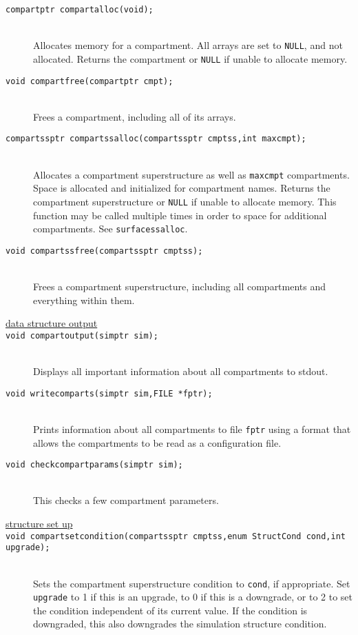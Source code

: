 \documentclass {book}
\begin{document}
\begin{description}
\item[\texttt{compartptr compartalloc(void);}]
\hfill \\
Allocates memory for a compartment.  All arrays are set to \texttt{NULL}, and not allocated.  Returns the compartment or \texttt{NULL} if unable to allocate memory.

\item[\texttt{void compartfree(compartptr cmpt);}]
\hfill \\
Frees a compartment, including all of its arrays.

\item[\texttt{compartssptr compartssalloc(compartssptr cmptss,int maxcmpt);}]
\hfill \\
Allocates a compartment superstructure as well as \texttt{maxcmpt} compartments.  Space is allocated and initialized for compartment names.  Returns the compartment superstructure or \texttt{NULL} if unable to allocate memory.  This function may be called multiple times in order to space for additional compartments.  See \texttt{surfacessalloc}.

\item[\texttt{void compartssfree(compartssptr cmptss);}]
\hfill \\
Frees a compartment superstructure, including all compartments and everything within them.

\item[\underline{data structure output}]

\item[\texttt{void compartoutput(simptr sim);}]
\hfill \\
Displays all important information about all compartments to stdout.

\item[\texttt{void writecomparts(simptr sim,FILE *fptr);}]
\hfill \\
Prints information about all compartments to file \texttt{fptr} using a format that allows the compartments to be read as a configuration file.

\item[\texttt{void checkcompartparams(simptr sim);}]
\hfill \\
This checks a few compartment parameters.

\item[\underline{structure set up}]

\item[\texttt{void compartsetcondition(compartssptr cmptss,enum StructCond cond,int upgrade);}]
\hfill \\
Sets the compartment superstructure condition to \texttt{cond}, if appropriate.  Set \texttt{upgrade} to 1 if this is an upgrade, to 0 if this is a downgrade, or to 2 to set the condition independent of its current value.  If the condition is downgraded, this also downgrades the simulation structure condition.


\end{description}
\end{document}
